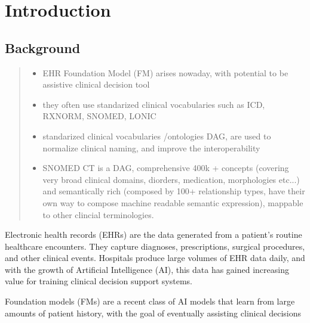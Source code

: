 \section{Introduction}
\label{sec:introduction}

\subsection{Background}
\begin{quote}\small\itshape
\begin{itemize}
\item EHR Foundation Model (FM) arises nowaday, with potential to be assistive clinical decision tool
\item they often use standarized clinical vocabularies such as ICD, RXNORM, SNOMED, LONIC
\item standarized clinical vocabularies /ontologies DAG, are used to normalize clinical naming, and improve the interoperability
\item SNOMED CT is a DAG, comprehensive 400k + concepts (covering very broad clinical domains, diorders, medication, morphologies etc...) and semantically rich (composed by 100+ relationship types, have their own way to compose machine readable semantic expression), mappable to other clincial terminologies.
\end{itemize}
\end{quote}
Electronic health records (EHRs) are the data generated from a patient's routine healthcare encounters. They capture diagnoses, prescriptions, surgical procedures, and other clinical events. Hospitals produce large volumes of EHR data daily, and with the growth of Artificial Intelligence (AI), this data has gained increasing value for training clinical decision support systems.

Foundation models (FMs) are a recent class of AI models that learn from large amounts of patient history, with the goal of eventually assisting clinical decisions 

